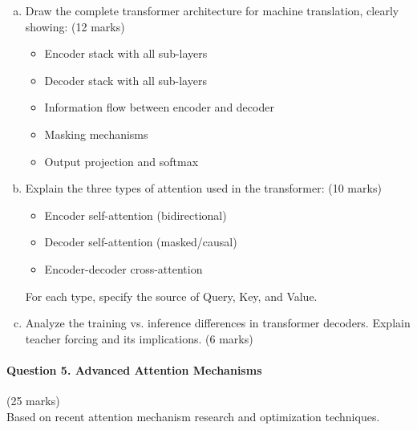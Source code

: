 \documentclass[12pt]{article}
\newcommand{\mediumanswer}{\vspace{3cm}}
\begin{document}
\begin{enumerate}[(a)]
    \item Draw the complete transformer architecture for machine translation, clearly showing: \hfill (12 marks)
    \begin{itemize}
        \item Encoder stack with all sub-layers
        \item Decoder stack with all sub-layers
        \item Information flow between encoder and decoder
        \item Masking mechanisms
        \item Output projection and softmax
    \end{itemize}
    
    \begin{center}
    \end{center}
    
    \item Explain the three types of attention used in the transformer: \hfill (10 marks)
    \begin{itemize}
        \item Encoder self-attention (bidirectional)
        \item Decoder self-attention (masked/causal)
        \item Encoder-decoder cross-attention
    \end{itemize}
    
    For each type, specify the source of Query, Key, and Value.
    
    \mediumanswer
    
    \item Analyze the training vs. inference differences in transformer decoders. Explain teacher forcing and its implications. \hfill (6 marks)
    
    \mediumanswer
\end{enumerate}

\newpage
\paragraph{Question 5. Advanced Attention Mechanisms}\hfill (25 marks)\\
Based on recent attention mechanism research and optimization techniques.
\end{document}
